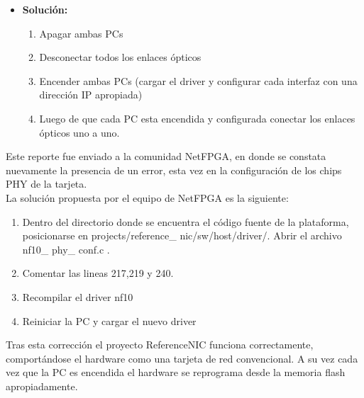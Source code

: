 \begin{itemize}
\item \textbf{Soluci\'on:}
\begin{enumerate}
\item Apagar ambas PCs
\item Desconectar todos los enlaces \'opticos
\item Encender ambas PCs (cargar el driver y configurar cada interfaz con una direcci\'on IP apropiada)
\item Luego de que cada PC esta encendida y configurada conectar los enlaces \'opticos uno a uno.
\end{enumerate}

\end{itemize}

Este reporte fue enviado a la comunidad NetFPGA, en donde se constata nuevamente la presencia de un error, esta vez en la configuraci\'on de los chips PHY de la tarjeta.\\ 

La soluci\'on propuesta por el equipo de NetFPGA es la siguiente:

\begin{enumerate}
\item Dentro del directorio donde se encuentra el c\'odigo fuente de la plataforma, posicionarse en 
	  projects/reference\_ nic/sw/host/driver/. Abrir el archivo nf10\_ phy\_ conf.c .
\item Comentar las lineas 217,219 y 240.
\item Recompilar el driver nf10
\item Reiniciar la PC y cargar el nuevo driver
\end{enumerate}

Tras esta correcci\'on el proyecto ReferenceNIC funciona correctamente, comportándose el hardware como una tarjeta de red convencional. A su vez cada vez que la PC es encendida el hardware se reprograma desde la memoria flash apropiadamente.


